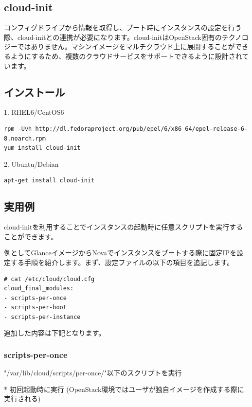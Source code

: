 \documentclass[9pt,b5paper,tombo,openany]{jsbook}
\begin{document}
\subsection{cloud-init}

コンフィグドライブから情報を取得し、ブート時にインスタンスの設定を行う際、cloud-initとの連携が必要になります。cloud-initはOpenStack固有のテクノロジーではありません。マシンイメージをマルチクラウド上に展開することができるようにするため、複数のクラウドサービスをサポートできるように設計されています。

\subsection{インストール}

1. RHEL6/CentOS6

\begin{lstlisting}
rpm -Uvh http://dl.fedoraproject.org/pub/epel/6/x86_64/epel-release-6-8.noarch.rpm
yum install cloud-init
\end{lstlisting}

2. Ubuntu/Debian

\begin{lstlisting}
apt-get install cloud-init
\end{lstlisting}

\subsection{実用例}

cloud-initを利用することでインスタンスの起動時に任意スクリプトを実行することができます。

例としてGlanceイメージからNovaでインスタンスをブートする際に固定IPを設定する手順を紹介します。まず、設定ファイルの以下の項目を追記します。

\begin{lstlisting}
# cat /etc/cloud/cloud.cfg
cloud_final_modules:
- scripts-per-once
- scripts-per-boot
- scripts-per-instance
\end{lstlisting}

追加した内容は下記となります。

\subsubsection{scripts-per-once}

"/var/lib/cloud/scripts/per-once/"以下のスクリプトを実行

* 初回起動時に実行 (OpenStack環境ではユーザが独自イメージを作成する際に実行される)
\end{document}
